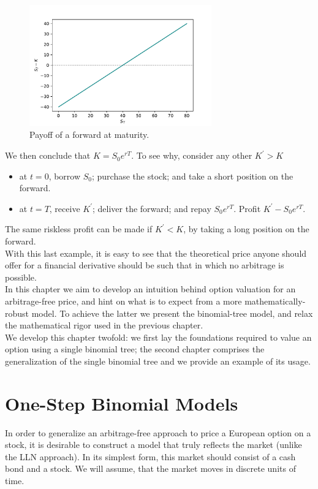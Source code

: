 \documentclass[../TGMAFFIRO.tex]{subfiles}
\begin{document}
\begin{figure}[hbt]
	\centering
  \includegraphics[width=0.7\textwidth]{../images/foward_payoff}
  \caption{Payoff of a forward at maturity.}
\end{figure}

We then conclude that $K=S_0e^{rT}$. To see why, consider any other $K^\prime > K$
\begin{itemize}
	\item at $t=0$, borrow $S_0$; purchase the stock; and take a short position on the forward.
	\item at $t=T$, receive $K^\prime$; deliver the forward; and repay $S_0e^{rT}$. Profit $K^\prime - S_0 e^{rT}$.
\end{itemize}

The same riskless profit can be made if $K^\prime < K$, by taking a long position on the forward.\\


With this last example, it is easy to see that the theoretical price anyone should offer for a financial derivative should be such that in which no arbitrage is possible.\\

 In this chapter we aim to develop an intuition behind option valuation for an arbitrage-free price, and hint on what is to expect from a more mathematically-robust model. To achieve the latter we present the binomial-tree model, and relax the mathematical rigor used in the previous chapter.\\

We develop this chapter twofold: we first lay the foundations required to value an option using a single binomial tree; the second chapter comprises the generalization of the single binomial tree and we provide an example of its usage.

\section{One-Step Binomial Models}
In order to generalize an arbitrage-free approach to price a European option on a stock, it is desirable to construct a model that truly reflects the market (unlike the LLN approach). In its simplest form, this market should consist of a cash bond and a stock. We will assume, that the market moves in discrete units of time.\\
\end{document}
